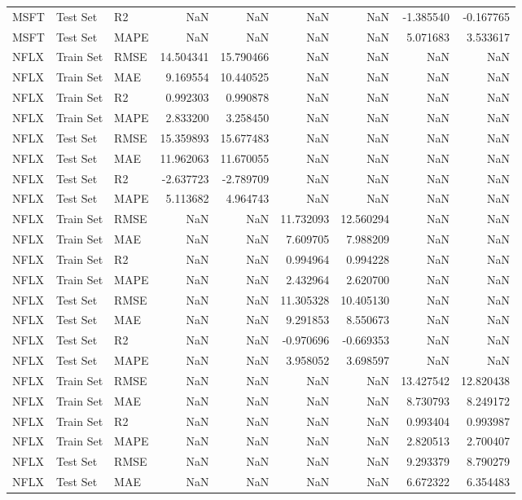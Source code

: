 \begin{tabular}{lllrrrrrr}
MSFT & Test Set & R2 & NaN & NaN & NaN & NaN & -1.385540 & -0.167765 \\
MSFT & Test Set & MAPE & NaN & NaN & NaN & NaN & 5.071683 & 3.533617 \\
NFLX & Train Set & RMSE & 14.504341 & 15.790466 & NaN & NaN & NaN & NaN \\
NFLX & Train Set & MAE & 9.169554 & 10.440525 & NaN & NaN & NaN & NaN \\
NFLX & Train Set & R2 & 0.992303 & 0.990878 & NaN & NaN & NaN & NaN \\
NFLX & Train Set & MAPE & 2.833200 & 3.258450 & NaN & NaN & NaN & NaN \\
NFLX & Test Set & RMSE & 15.359893 & 15.677483 & NaN & NaN & NaN & NaN \\
NFLX & Test Set & MAE & 11.962063 & 11.670055 & NaN & NaN & NaN & NaN \\
NFLX & Test Set & R2 & -2.637723 & -2.789709 & NaN & NaN & NaN & NaN \\
NFLX & Test Set & MAPE & 5.113682 & 4.964743 & NaN & NaN & NaN & NaN \\
NFLX & Train Set & RMSE & NaN & NaN & 11.732093 & 12.560294 & NaN & NaN \\
NFLX & Train Set & MAE & NaN & NaN & 7.609705 & 7.988209 & NaN & NaN \\
NFLX & Train Set & R2 & NaN & NaN & 0.994964 & 0.994228 & NaN & NaN \\
NFLX & Train Set & MAPE & NaN & NaN & 2.432964 & 2.620700 & NaN & NaN \\
NFLX & Test Set & RMSE & NaN & NaN & 11.305328 & 10.405130 & NaN & NaN \\
NFLX & Test Set & MAE & NaN & NaN & 9.291853 & 8.550673 & NaN & NaN \\
NFLX & Test Set & R2 & NaN & NaN & -0.970696 & -0.669353 & NaN & NaN \\
NFLX & Test Set & MAPE & NaN & NaN & 3.958052 & 3.698597 & NaN & NaN \\
NFLX & Train Set & RMSE & NaN & NaN & NaN & NaN & 13.427542 & 12.820438 \\
NFLX & Train Set & MAE & NaN & NaN & NaN & NaN & 8.730793 & 8.249172 \\
NFLX & Train Set & R2 & NaN & NaN & NaN & NaN & 0.993404 & 0.993987 \\
NFLX & Train Set & MAPE & NaN & NaN & NaN & NaN & 2.820513 & 2.700407 \\
NFLX & Test Set & RMSE & NaN & NaN & NaN & NaN & 9.293379 & 8.790279 \\
NFLX & Test Set & MAE & NaN & NaN & NaN & NaN & 6.672322 & 6.354483 \\

\end{tabular}
